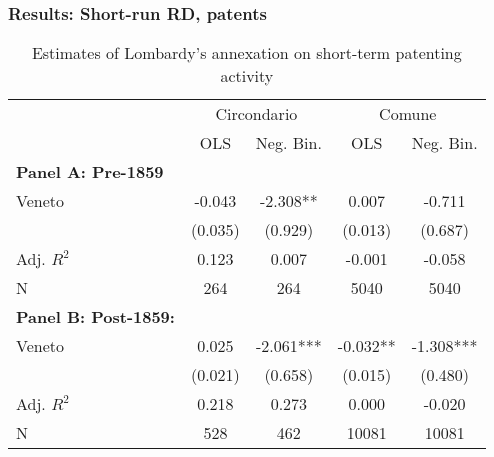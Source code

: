 \documentclass[10pt]{beamer}
\begin{document}
    




\begin{frame}
    \frametitle{Results: Short-run RD, patents}

        \begin{table}
        \centering
        \caption{Estimates of Lombardy's annexation on short-term patenting activity\label{tab:patent}}
            \begin{tabular}{lcccc}  %
            \toprule
            & \multicolumn{2}{c}{Circondario} & \multicolumn{2}{c}{Comune} \\ \cmidrule(lr){2-3}\cmidrule(lr){4-5}
            & OLS & Neg. Bin. & OLS & Neg. Bin. \\ \midrule
            \textbf{Panel A: Pre-1859} & & & & \\
            Veneto & -0.043 & -2.308** & 0.007 & -0.711 \\
            & (0.035) & (0.929) & (0.013) & (0.687) \\
            Adj. $R^2$ & 0.123 & 0.007 & -0.001 & -0.058 \\
            N & 264 & 264 & 5040 & 5040 \\ \midrule
            \textbf{Panel B: Post-1859:} & & & & \\
            Veneto & 0.025 & -2.061*** & -0.032** & -1.308*** \\
            & (0.021) & (0.658) & (0.015) & (0.480) \\
            Adj. $R^2$ & 0.218 & 0.273 & 0.000 & -0.020 \\
            N & 528 & 462 & 10081 & 10081 \\
            \bottomrule
            \end{tabular}
        
        \end{table}

\end{frame}
\end{document}
